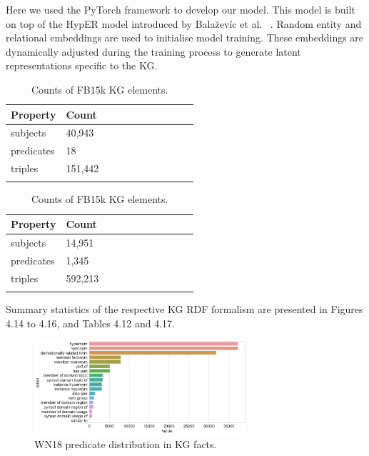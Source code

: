 \noindent Here we used the PyTorch framework to develop our model. This model is built on top of the HypER model introduced by Bala\u{z}ev\'{i}c et al. \unskip ~\citep{balazevic2019hypernetwork}. Random entity and relational embeddings are used to initialise model training. These embeddings are dynamically adjusted during the training process to generate latent representations specific to the KG.

\bigskip

\begin{table}[H]
	\parbox{.5\linewidth}{
		\centering
		\begin{tabular}{lllllllllll}
  			\textbf{Property} & \textbf{Count}  \\
  			\hline
  			subjects & 40,943  \\
  			predicates & 18  \\
  			triples & 151,442 \\
			&
		\end{tabular}
		\captionsetup{justification=centering}
		\caption{Counts of WN18 KG elements.}
		}
	\hfill
	\parbox{.5\linewidth}{
		\centering
		\begin{tabular}{lllllllllll}
  			\textbf{Property} & \textbf{Count}  \\
  			\hline
  			subjects & 14,951   \\
  			predicates & 1,345  \\
  			triples & 592,213  \\
			&
		\end{tabular}
		\captionsetup{justification=centering}
		\caption{Counts of FB15k KG elements.}
		}
\end{table}



\noindent Summary statistics of the respective KG RDF formalism are presented in Figures 4.14 to 4.16, and Tables 4.12 and 4.17. 

\begin{figure}[H]
   	\centering
    	\includegraphics[width=0.7\textwidth, height=0.3\textheight]{WN18_Predicate_Counts}
	\captionsetup{justification=centering}
	\caption{WN18 predicate distribution in KG facts.}
\end{figure}

